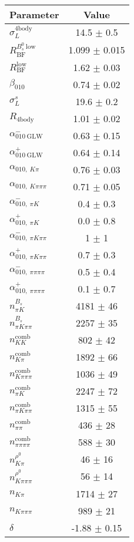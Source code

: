 \begin{table}[h]
  \centering
  \begin{tabular}{lc}
      \toprule
      Parameter & Value \\
      \midrule
      $\sigma_L^{\mathrm{4body}}$ & 14.5 $\pm$ 0.5 \\
      $R_\mathrm{BF}^{B^0_s\ \mathrm{low}}$ & 1.099 $\pm$ 0.015 \\
      $R_\mathrm{BF}^{\mathrm{low}}$ & 1.62 $\pm$ 0.03 \\
      $\beta_{010}$ & 0.74 $\pm$ 0.02 \\
      $\sigma_L^s$ & 19.6 $\pm$ 0.2 \\
      $R_{\mathrm{4body}}$ & 1.01 $\pm$ 0.02 \\
      $\alpha_{010\ \mathrm{GLW}}^-$ & 0.63 $\pm$ 0.15 \\
      $\alpha_{010\ \mathrm{GLW}}^+$ & 0.64 $\pm$ 0.14 \\
      $\alpha_{010,\ K\pi}$ & 0.76 $\pm$ 0.03 \\
      $\alpha_{010,\ K\pi\pi\pi}$ & 0.71 $\pm$ 0.05 \\
      $\alpha_{010,\ \pi K}^-$ & 0.4 $\pm$ 0.3 \\
      $\alpha_{010,\ \pi K}^+$ & 0.0 $\pm$ 0.8 \\
      $\alpha_{010,\ \pi K\pi\pi}^-$ & 1 $\pm$ 1 \\
      $\alpha_{010,\ \pi K\pi\pi}^+$ & 0.7 $\pm$ 0.3 \\
      $\alpha_{010,\ \pi\pi\pi\pi}^-$ & 0.5 $\pm$ 0.4 \\
      $\alpha_{010,\ \pi\pi\pi\pi}^+$ & 0.1 $\pm$ 0.7 \\
      $n_{\pi K}^{B_s}$ & 4181 $\pm$ 46 \\      $n_{\pi K\pi\pi}^{B_s}$ & 2257 $\pm$ 35 \\      $n_{KK}^\mathrm{comb}$ & 802 $\pm$ 42 \\      $n_{K\pi}^\mathrm{comb}$ & 1892 $\pm$ 66 \\      $n_{K\pi\pi\pi}^\mathrm{comb}$ & 1036 $\pm$ 49 \\      $n_{\pi K}^\mathrm{comb}$ & 2247 $\pm$ 72 \\      $n_{\pi K\pi\pi}^\mathrm{comb}$ & 1315 $\pm$ 55 \\      $n_{\pi\pi}^\mathrm{comb}$ & 436 $\pm$ 28 \\      $n_{\pi\pi\pi\pi}^\mathrm{comb}$ & 588 $\pm$ 30 \\      $n_{K\pi}^{\rho^0}$ & 46 $\pm$ 16 \\      $n_{K\pi\pi\pi}^{\rho^0}$ & 56 $\pm$ 14 \\      $n_{K\pi}$ & 1714 $\pm$ 27 \\      $n_{K\pi\pi\pi}$ & 989 $\pm$ 21 \\      $\delta$ & -1.88 $\pm$ 0.15 \\

\end{tabular}
\end{table}
